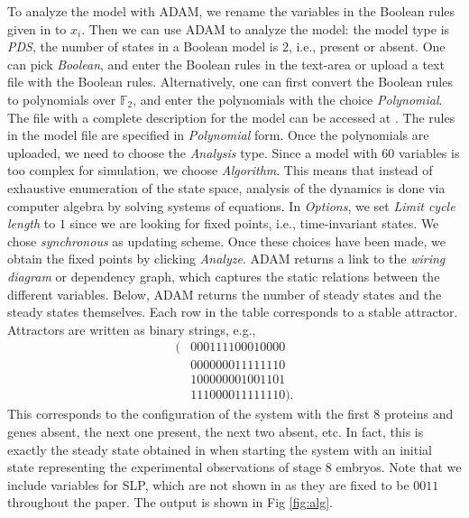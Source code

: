 \documentclass[11pt]{amsart}
\begin{document}
To analyze the model with ADAM, we rename the variables in the Boolean rules given in \cite{AO} to $x_i$. Then we can use ADAM to analyze the model: the model type is {\it PDS}, the number of states in a Boolean model is $2$, i.e., present or absent. One can pick {\it Boolean}, and enter the Boolean rules in the text-area or upload a text file with the Boolean rules. Alternatively, one can first convert the Boolean rules to polynomials over $\mathbb F_2$, and enter the polynomials with the choice {\it Polynomial}.
The file with a complete description for the model can be accessed at \cite{DrosophilaModel}. The rules in the model file are specified in {\it Polynomial} form. Once the polynomials are uploaded, we need to choose the {\it Analysis} type. Since a model with $60$ variables is too complex for simulation, we choose {\it Algorithm}. This means that instead of exhaustive enumeration of the state space, analysis of the dynamics is done via computer algebra by solving systems of equations.
In {\it Options}, we set {\it Limit cycle length} to $1$ since we are looking for fixed points, i.e., time-invariant states.
We chose {\it synchronous} as updating scheme. Once these choices have been made,
we obtain the fixed points by clicking {\it Analyze}.
ADAM returns a link to the {\it wiring diagram} or dependency graph, which captures the static relations between the different variables. Below, ADAM returns the number of steady states and the steady states themselves.
Each row in the table corresponds to a stable attractor. Attractors are written as binary strings, e.g.,
\begin{align*}
(&0 0 0 1 1 1 1 0 0 0 1 0 0 0 0\\
&0 0 0 0 0 0 0 1 1 1 1 1 1 1 0\\
&1 0 0 0 0 0 0 0 1 0 0 1 1 0 1\\
&1 1 1 0 0 0 0 1 1 1 1 1 1 1 0).
\end{align*}
This corresponds to the configuration of the system with the first 8 proteins and genes absent, the next one present, the next two absent, etc. In fact, this is exactly the steady state obtained in \cite[Figure 4(b)]{AO} when starting the system with an initial state representing the experimental observations of stage 8 embryos. Note that we include variables for SLP, which are not shown in \cite[Figure 4(b)]{AO} as they are fixed to be $0011$ throughout the paper. The output is shown in Fig \ref{fig:alg}.
\end{document}
